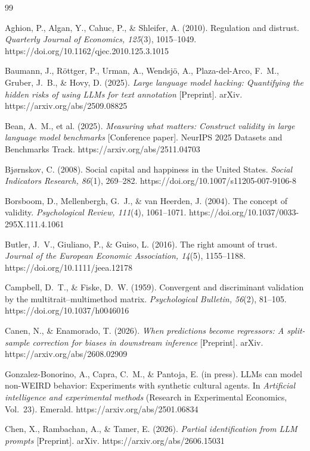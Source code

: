 \documentclass[10pt,letterpaper]{article}
\begin{document}
\begin{thebibliography}{99}\small

 Aghion, P., Algan, Y., Cahuc, P., \& Shleifer, A. (2010). Regulation and distrust. \textit{Quarterly Journal of Economics, 125}(3), 1015--1049. https://doi.org/10.1162/qjec.2010.125.3.1015

 Baumann, J., R\"ottger, P., Urman, A., Wendsj\"o, A., Plaza-del-Arco, F.~M., Gruber, J.~B., \& Hovy, D. (2025). \textit{Large language model hacking: Quantifying the hidden risks of using LLMs for text annotation} [Preprint]. arXiv. https://arxiv.org/abs/2509.08825

 Bean, A.~M., et al. (2025). \textit{Measuring what matters: Construct validity in large language model benchmarks} [Conference paper]. NeurIPS 2025 Datasets and Benchmarks Track. https://arxiv.org/abs/2511.04703

 Bj\o rnskov, C. (2008). Social capital and happiness in the United States. \textit{Social Indicators Research, 86}(1), 269--282. https://doi.org/10.1007/s11205-007-9106-8

 Borsboom, D., Mellenbergh, G.~J., \& van Heerden, J. (2004). The concept of validity. \textit{Psychological Review, 111}(4), 1061--1071. https://doi.org/10.1037/0033-295X.111.4.1061

 Butler, J.~V., Giuliano, P., \& Guiso, L. (2016). The right amount of trust. \textit{Journal of the European Economic Association, 14}(5), 1155--1188. https://doi.org/10.1111/jeea.12178

 Campbell, D.~T., \& Fiske, D.~W. (1959). Convergent and discriminant validation by the multitrait--multimethod matrix. \textit{Psychological Bulletin, 56}(2), 81--105. https://doi.org/10.1037/h0046016

 Canen, N., \& Enamorado, T. (2026). \textit{When predictions become regressors: A split-sample correction for biases in downstream inference} [Preprint]. arXiv. https://arxiv.org/abs/2608.02909

 Gonzalez-Bonorino, A., Capra, C.~M., \& Pantoja, E. (in press). LLMs can model non-WEIRD behavior: Experiments with synthetic cultural agents. In \textit{Artificial intelligence and experimental methods} (Research in Experimental Economics, Vol.~23). Emerald. https://arxiv.org/abs/2501.06834

 Chen, X., Rambachan, A., \& Tamer, E. (2026). \textit{Partial identification from LLM prompts} [Preprint]. arXiv. https://arxiv.org/abs/2606.15031


\end{thebibliography}
\end{document}
